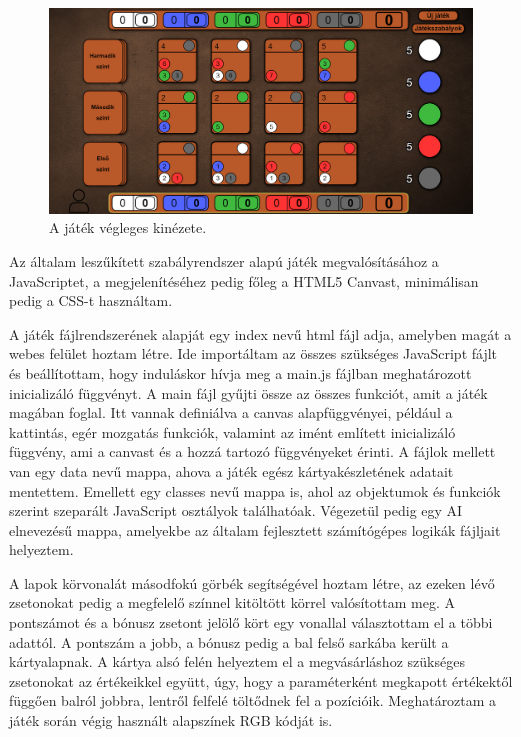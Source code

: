 \begin{figure}[h]
\centering
\includegraphics[scale=0.3]{images/screen_structure.png}
\caption{A játék végleges kinézete.}
\label{fig:screen_structure}
\end{figure}


Az általam leszűkített szabályrendszer alapú játék megvalósításához a JavaScriptet, a megjelenítéséhez pedig főleg a HTML5 Canvast, minimálisan pedig a CSS-t használtam.

A játék fájlrendszerének alapját egy index nevű html fájl adja, amelyben magát a webes felület hoztam létre. Ide importáltam az összes szükséges JavaScript fájlt és beállítottam, hogy induláskor hívja meg a main.js fájlban meghatározott inicializáló függvényt. A main fájl gyűjti össze az összes funkciót, amit a játék magában foglal. Itt vannak definiálva a canvas alapfüggvényei, például a kattintás, egér mozgatás funkciók, valamint az imént említett inicializáló függvény, ami a canvast és a hozzá tartozó függvényeket érinti. A fájlok mellett van egy data nevű mappa, ahova a játék egész kártyakészletének adatait mentettem. Emellett egy classes nevű mappa is, ahol az objektumok és funkciók szerint szeparált JavaScript osztályok találhatóak. Végezetül pedig egy AI elnevezésű mappa, amelyekbe az általam fejlesztett számítógépes logikák fájljait helyeztem.


A lapok körvonalát másodfokú görbék segítségével hoztam létre, az ezeken lévő zsetonokat pedig a megfelelő színnel kitöltött körrel valósítottam meg. A pontszámot és a bónusz zsetont jelölő kört egy vonallal választottam el a többi adattól. A pontszám a jobb, a bónusz pedig a bal felső sarkába került a kártyalapnak. A kártya alsó felén helyeztem el a megvásárláshoz szükséges zsetonokat az értékeikkel együtt, úgy, hogy a paraméterként megkapott értékektől függően balról jobbra, lentről felfelé töltődnek fel a pozícióik. Meghatároztam a játék során végig használt alapszínek RGB kódját is.

